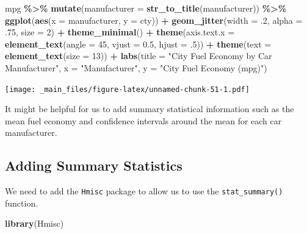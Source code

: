 \documentclass[
]{book}
\newenvironment{Shaded}{\begin{snugshade}}{\end{snugshade}}
\newcommand{\AttributeTok}[1]{\textcolor[rgb]{0.13,0.29,0.53}{#1}}
\newcommand{\DecValTok}[1]{\textcolor[rgb]{0.00,0.00,0.81}{#1}}
\newcommand{\FloatTok}[1]{\textcolor[rgb]{0.00,0.00,0.81}{#1}}
\newcommand{\FunctionTok}[1]{\textcolor[rgb]{0.13,0.29,0.53}{\textbf{#1}}}
\newcommand{\NormalTok}[1]{#1}
\newcommand{\SpecialCharTok}[1]{\textcolor[rgb]{0.81,0.36,0.00}{\textbf{#1}}}
\newcommand{\StringTok}[1]{\textcolor[rgb]{0.31,0.60,0.02}{#1}}
\begin{document}
\begin{Shaded}
\begin{Highlighting}[]
\NormalTok{mpg }\SpecialCharTok{\%\textgreater{}\%}
  \FunctionTok{mutate}\NormalTok{(}\AttributeTok{manufacturer =} \FunctionTok{str\_to\_title}\NormalTok{(manufacturer)) }\SpecialCharTok{\%\textgreater{}\%}
  \FunctionTok{ggplot}\NormalTok{(}\FunctionTok{aes}\NormalTok{(}\AttributeTok{x =}\NormalTok{ manufacturer, }\AttributeTok{y =}\NormalTok{ cty)) }\SpecialCharTok{+} 
  \FunctionTok{geom\_jitter}\NormalTok{(}\AttributeTok{width =}\NormalTok{ .}\DecValTok{2}\NormalTok{, }\AttributeTok{alpha =}\NormalTok{ .}\DecValTok{75}\NormalTok{, }\AttributeTok{size =} \DecValTok{2}\NormalTok{) }\SpecialCharTok{+} 
  \FunctionTok{theme\_minimal}\NormalTok{() }\SpecialCharTok{+}
  \FunctionTok{theme}\NormalTok{(}\AttributeTok{axis.text.x =} \FunctionTok{element\_text}\NormalTok{(}\AttributeTok{angle =} \DecValTok{45}\NormalTok{, }\AttributeTok{vjust =} \FloatTok{0.5}\NormalTok{, }\AttributeTok{hjust =}\NormalTok{ .}\DecValTok{5}\NormalTok{)) }\SpecialCharTok{+}
  \FunctionTok{theme}\NormalTok{(}\AttributeTok{text =} \FunctionTok{element\_text}\NormalTok{(}\AttributeTok{size =} \DecValTok{13}\NormalTok{)) }\SpecialCharTok{+}
  \FunctionTok{labs}\NormalTok{(}\AttributeTok{title =} \StringTok{"City Fuel Economy by Car Manufacturer"}\NormalTok{,}
       \AttributeTok{x =} \StringTok{"Manufacturer"}\NormalTok{, }
       \AttributeTok{y =} \StringTok{"City Fuel Economy (mpg)"}\NormalTok{)}
\end{Highlighting}
\end{Shaded}

\texttt{[image: \_main\_files/figure-latex/unnamed-chunk-51-1.pdf]}

It might be helpful for us to add summary statistical information such as the mean fuel economy and confidence intervals around the mean for each car manufacturer.

\hypertarget{adding-summary-statistics}{%
\subsection{Adding Summary Statistics}\label{adding-summary-statistics}}

We need to add the \texttt{Hmisc} package to allow us to use the \texttt{stat\_summary()} function.

\begin{Shaded}
\begin{Highlighting}[]
\FunctionTok{library}\NormalTok{(Hmisc)}
\end{Highlighting}
\end{Shaded}
\end{document}

